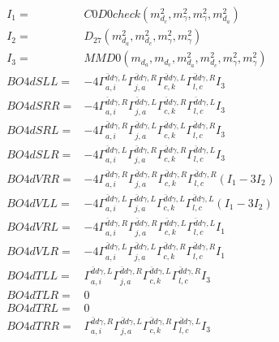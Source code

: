 \documentclass[A4,landscape]{article}
\begin{document}
\begin{align} 
I_1 = & C0D0check(m^2_{d_{{c}}}, m^2_{\gamma}, m^2_{\gamma}, m^2_{d_{{a}}}) \\ 
I_2 = & D_{27}(m^2_{d_{{a}}}, m^2_{d_{{c}}}, m^2_{\gamma}, m^2_{\gamma}) \\ 
I_3 = & MMD0(m_{d_{{a}}}, m_{d_{{c}}}, m^2_{d_{{a}}}, m^2_{d_{{c}}}, m^2_{\gamma}, m^2_{\gamma}) \\ 
  BO4dSLL= & -4  \Gamma^{\bar{d}d \gamma ,L}_{a, i} \Gamma^{\bar{d}d \gamma ,R}_{j, a} \Gamma^{\bar{d}d \gamma ,L}_{c, k} \Gamma^{\bar{d}d \gamma ,R}_{l, c} I_3 \\ 
  BO4dSRR= & -4  \Gamma^{\bar{d}d \gamma ,R}_{a, i} \Gamma^{\bar{d}d \gamma ,L}_{j, a} \Gamma^{\bar{d}d \gamma ,R}_{c, k} \Gamma^{\bar{d}d \gamma ,L}_{l, c} I_3 \\ 
  BO4dSRL= & -4  \Gamma^{\bar{d}d \gamma ,R}_{a, i} \Gamma^{\bar{d}d \gamma ,L}_{j, a} \Gamma^{\bar{d}d \gamma ,L}_{c, k} \Gamma^{\bar{d}d \gamma ,R}_{l, c} I_3 \\ 
  BO4dSLR= & -4  \Gamma^{\bar{d}d \gamma ,L}_{a, i} \Gamma^{\bar{d}d \gamma ,R}_{j, a} \Gamma^{\bar{d}d \gamma ,R}_{c, k} \Gamma^{\bar{d}d \gamma ,L}_{l, c} I_3 \\ 
  BO4dVRR= & -4  \Gamma^{\bar{d}d \gamma ,R}_{a, i} \Gamma^{\bar{d}d \gamma ,R}_{j, a} \Gamma^{\bar{d}d \gamma ,R}_{c, k} \Gamma^{\bar{d}d \gamma ,R}_{l, c} (I_1 - 3 I_2) \\ 
  BO4dVLL= & -4  \Gamma^{\bar{d}d \gamma ,L}_{a, i} \Gamma^{\bar{d}d \gamma ,L}_{j, a} \Gamma^{\bar{d}d \gamma ,L}_{c, k} \Gamma^{\bar{d}d \gamma ,L}_{l, c} (I_1 - 3 I_2) \\ 
  BO4dVRL= & -4  \Gamma^{\bar{d}d \gamma ,R}_{a, i} \Gamma^{\bar{d}d \gamma ,R}_{j, a} \Gamma^{\bar{d}d \gamma ,L}_{c, k} \Gamma^{\bar{d}d \gamma ,L}_{l, c} I_1 \\ 
  BO4dVLR= & -4  \Gamma^{\bar{d}d \gamma ,L}_{a, i} \Gamma^{\bar{d}d \gamma ,L}_{j, a} \Gamma^{\bar{d}d \gamma ,R}_{c, k} \Gamma^{\bar{d}d \gamma ,R}_{l, c} I_1 \\ 
  BO4dTLL= &  \Gamma^{\bar{d}d \gamma ,L}_{a, i} \Gamma^{\bar{d}d \gamma ,R}_{j, a} \Gamma^{\bar{d}d \gamma ,L}_{c, k} \Gamma^{\bar{d}d \gamma ,R}_{l, c} I_3 \\ 
  BO4dTLR= & 0 \\ 
  BO4dTRL= & 0 \\ 
  BO4dTRR= &  \Gamma^{\bar{d}d \gamma ,R}_{a, i} \Gamma^{\bar{d}d \gamma ,L}_{j, a} \Gamma^{\bar{d}d \gamma ,R}_{c, k} \Gamma^{\bar{d}d \gamma ,L}_{l, c} I_3 \\ 
\end{align} 
\end{document}
